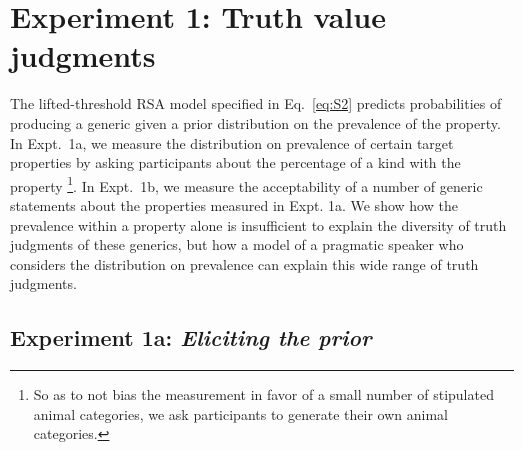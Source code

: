 \documentclass[10pt,letterpaper]{article}
\begin{document}
%

\section{Experiment 1: Truth value judgments}

The lifted-threshold RSA model specified in Eq.~\ref{eq:S2} predicts probabilities of producing a generic given a prior distribution on the prevalence of the property. 
In Expt.~1a, we measure the distribution on prevalence of certain target properties by asking participants about the percentage of a kind with the property \footnote{So as to not bias the measurement in favor of a small number of stipulated animal categories, we ask participants to generate their own animal categories.}. 
In Expt.~1b, we measure the acceptability of a number of generic statements about the properties measured in Expt. 1a. 
We show how the prevalence within a property alone is insufficient to explain the diversity of truth judgments of these generics, but how a model of a pragmatic speaker who considers the distribution on prevalence can explain this wide range of truth judgments.

\subsection{Experiment 1a: \emph{Eliciting the prior}}
\end{document}
